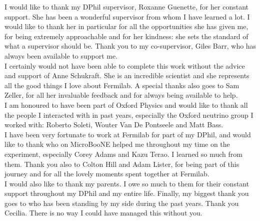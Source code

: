 
I would like to thank my DPhil supervisor, Roxanne Guenette, for her constant support. She has been a wonderful supervisor from whom I have learned a lot. I would like to thank her in particular for all the opportunities she has given me, for being extremely approachable and for her kindness: she sets the standard of what a supervisor should be.
Thank you to my co-supervisor, Giles Barr, who has always been available to support me.\\

I certainly would not have been able to complete this work without the advice and support of Anne Schukraft. She is an incredible scientist and she represents all the good things I love about Fermilab. A special thanks also goes to Sam Zeller, for all her invaluable feedback and for always being available to help.\\ 

I am honoured to have been part of Oxford Physics and would like to thank all the people I interacted with in past years, especially the Oxford neutrino group I worked with: Roberto Soleti, Wouter Van De Pontseele and Matt Bass. \\

I have been very fortunate to work at Fermilab for part of my DPhil, and would like to thank who on MicroBooNE helped me throughout my time on the experiment, especially Corey Adams and Kazu Terao. I learned so much from them.
Thank you also to Colton Hill and Adam Lister, for being part of this journey and for all the lovely moments spent together at Fermilab. \\

I would also like to thank my parents. I owe so much to them for their constant support throughout my DPhil and my entire life.  
Finally, my biggest thank you goes to who has been standing by my side during the past years. Thank you Cecilia. There is no way I could have managed this without you.